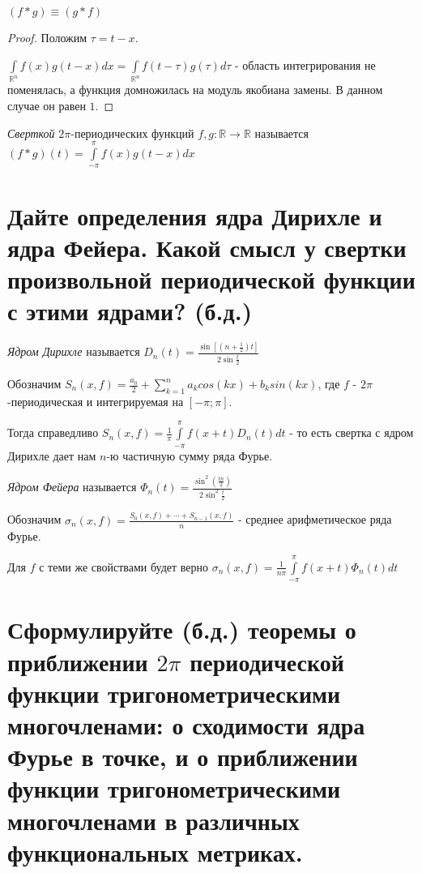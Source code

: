 \documentclass{article}
\begin{document}
	\begin{theorem} 
		$(f*g) \equiv (g*f)$ 
	\end{theorem}
	\begin{proof}
		Положим $\tau=t-x$.
		
		$\int\limits_{\mathbb{R}^n} f(x)g(t-x)dx =\int\limits_{\mathbb{R}^n} f(t-\tau)g(\tau)d\tau$ - область интегрирования не поменялась, а функция домножилась на модуль якобиана замены. В данном случае он равен $1$.
	\end{proof}
	\begin{definition}
		\textit{Сверткой} $2\pi$-периодических функций $f, g: \mathbb{R} \to \mathbb{R}$ называется $(f*g)(t)=\int\limits_{-\pi}^{\pi} f(x)g(t-x)dx$
	\end{definition}
	
	\section{Дайте определения ядра Дирихле и ядра Фейера. Какой смысл у свертки произвольной периодической функции с этими ядрами? (б.д.)}
	
	\begin{definition}
		\textit{Ядром Дирихле} называется $D_n(t)=\frac{\sin[(n+\frac{1}{2})t]}{2\sin{\frac{t}{2}}}$
	\end{definition}

	Обозначим $S_n(x,f)=\frac{a_0}{2} + \sum_{k=1}^{n} a_k cos(kx) + b_k sin(kx)$, где $f$ - $2\pi$-периодическая и интегрируемая на $[-\pi; \pi]$. 
	
	Тогда справедливо $S_n(x, f)=\frac{1}{\pi}\int\limits_{-\pi}^{\pi}f(x+t)D_n(t) dt$ - то есть свертка с ядром Дирихле дает нам $n$-ю частичную сумму ряда Фурье.

	\begin{definition}
		\textit{Ядром Фейера} называется $\Phi_n(t)=\frac{\sin^2(\frac{tn}{2})}{2\sin^2{\frac{t}{2}}}$
	\end{definition}

	Обозначим $\sigma_n(x,f)=\frac{S_0(x, f)+\cdots+S_{n-1}(x, f)}{n}$ - среднее арифметическое ряда Фурье. 
	
	Для $f$ с теми же свойствами будет верно $\sigma_n(x, f)=\frac{1}{n\pi}\int\limits_{-\pi}^{\pi}f(x+t)\Phi_n(t) dt$
	 
	\section{Сформулируйте (б.д.) теоремы о приближении $2\pi$ периодической функции тригонометрическими многочленами: о сходимости ядра Фурье в точке, и о приближении функции тригонометрическими многочленами в различных функциональных метриках.} 
	
\end{document}
